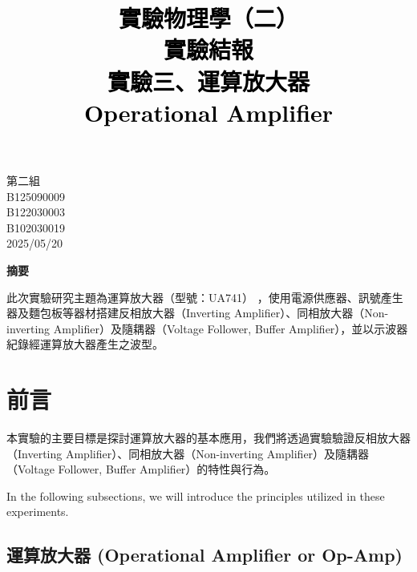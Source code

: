 \documentclass[12pt,a4paper]{article}
\title{\vspace{-0.5cm}
       {\bf \textcolor{black}{{\LARGE 
       \begin{CJK}{UTF8}{bkai}
       實驗物理學（二）\\
       \vspace{6pt}
       實驗結報\\
       \vspace{60pt}
       實驗三、運算放大器\\
       \vspace{6pt}
       Operational Amplifier
       \end{CJK}
       }}
       }
       }
\author{}
\date{}
\begin{document}
\begin{CJK}{UTF8}{bkai}

\maketitle
\thispagestyle{empty}

\vspace{10cm}
\begin{center}
{\large 第二組}\\ \vspace{12pt}
{\large {} B125090009}\\ \vspace{6pt}
{\large {}  B122030003}\\ \vspace{6pt}
{\large {} B102030019}\\ \vspace{12pt}
{\large 2025/05/20}\\
\end{center}

\clearpage

\vspace{1cm}
\begin{center}
{\large\bf\sc 摘要}
\end{center}

\noindent 

此次實驗研究主題為運算放大器（型號：UA741） ，使用電源供應器、訊號產生器及麵包板等器材搭建反相放大器（Inverting Amplifier）、同相放大器（Non-inverting Amplifier）及隨耦器（Voltage Follower, Buffer Amplifier），並以示波器紀錄經運算放大器產生之波型。 

\section{前言}
\hfill

本實驗的主要目標是探討運算放大器的基本應用，我們將透過實驗驗證反相放大器（Inverting Amplifier）、同相放大器（Non-inverting Amplifier）及隨耦器（Voltage Follower, Buffer Amplifier）的特性與行為。 

In the following subsections, we will introduce the principles utilized in these experiments.

\subsection{運算放大器 (Operational Amplifier or Op-Amp)}
\hfill


\end{CJK}
\end{document}
